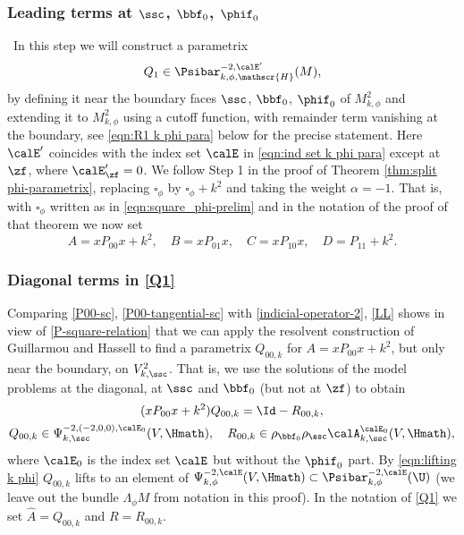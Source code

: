 \subsubsection{Leading terms at $\ssc$, $\bbf_0$, $\phif_0$} \
In this step we will construct a parametrix
\begin{equation}
\label{eqn:Q_1 k phi para}
Q_1\in \Psibar_{k,\phi,\mathscr{H}}^{-2,\calE'} (M),
\end{equation}
by defining it near the boundary faces $\ssc$, $\bbf_0$, $\phif_0$ of $M^2_{k,\phi}$ and extending it to $M^2_{k,\phi}$ using a cutoff function,
with remainder term vanishing at the boundary, see \eqref{eqn:R1 k phi para} below for the precise
statement. Here $\calE'$ coincides with the index set $\calE$ in
\eqref{eqn:ind set k phi para} except at $\zf$, where $\calE'_\zf=0$.
We follow Step 1 in the proof of Theorem \ref{thm:split phi-parametrix},
replacing $\square_\phi$ by $\square_\phi+k^2$ and taking the weight $\alpha=-1$.
That is, with $\square_\phi$ written as in \eqref{eqn:square_phi-prelim} and in the
notation of the proof of that theorem we now set
\[
A=xP_{00}x+k^2, \quad B=xP_{01}x, \quad C=xP_{10}x, \quad D=P_{11}+k^2.
\]

\subsubsection*{Diagonal terms in \eqref{Q1}}
Comparing \eqref{P00-sc}, \eqref{P00-tangential-sc} with \eqref{indicial-operator-2}, \eqref{LL}
shows in view of \eqref{P-square-relation} that we can apply the
resolvent construction of Guillarmou and Hassell to find a parametrix $Q_{00,k}$ for $A=xP_{00}x+k^2$,
but only near the boundary, \ie on $V^2_{k,\ssc}$. That is, we use the solutions of the model
problems at the diagonal, at $\ssc$ and $\bbf_0$ (but not at $\zf$) to obtain
\begin{equation}
\begin{gathered}
(xP_{00}x+k^2)Q_{00,k} = \Id-R_{00,k},\\
Q_{00,k}\in\Psi_{k,\ssc}^{-2,(-2,0,0),\calE_0}(V,\Hmath), \quad
R_{00,k}\in \rho_{\bbf_0} \rho_\ssc\calA_{k,\ssc}^{\calE_0}(V,\Hmath),
\end{gathered}
\end{equation}
where $\calE_0$ is the index set $\calE$ but without the $\phif_0$ part.
By \eqref{eqn:lifting k phi} $Q_{00,k}$ lifts to an element of $\Psi^{-2,\calE}_{k,\phi}(V,\Hmath)\subset\Psibar^{-2,\calE}_{k,\phi}(\U)$ (we leave out the bundle $\Lambda_\phi M$ from notation in this proof).
In the notation of \eqref{Q1} we set $\widehat{A}= Q_{00,k}$ and $R = R_{00,k}$.

